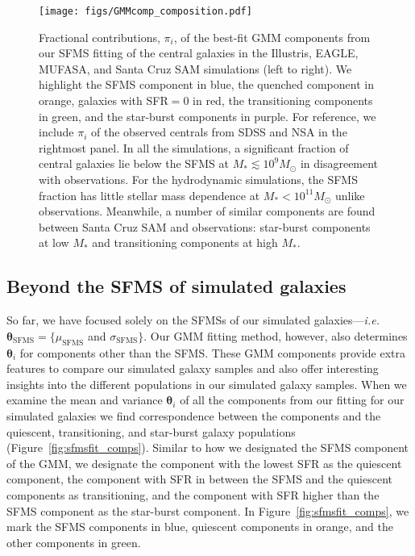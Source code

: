 \documentclass[preprint2,tighten]{aastex62}
\begin{document}
\begin{figure*}
\begin{center}
\texttt{[image: figs/GMMcomp\_composition.pdf]} 
\caption{Fractional contributions, $\pi_i$, of the best-fit GMM components from 
    our SFMS fitting of the central galaxies in the Illustris, EAGLE, MUFASA, 
    and Santa Cruz SAM simulations (left to right). We highlight the SFMS 
    component in blue, the quenched component in orange, galaxies with 
    SFR$=0$ in red, the transitioning components in green, and the star-burst
    components in purple. For reference, we include $\pi_i$ of the observed 
    centrals from SDSS and NSA in the rightmost panel. In all the simulations, 
    a significant fraction of central galaxies lie below the SFMS at 
    $M_* \lesssim 10^9 M_\odot$ in disagreement with observations. For the 
    hydrodynamic simulations, the SFMS fraction has little stellar mass dependence
    at $M_* < 10^{11}M_\odot$ unlike observations. Meanwhile, a number of similar 
    components are found between Santa Cruz SAM and observations: star-burst 
    components at low $M_*$ and transitioning components at high $M_*$. 
    } \label{fig:kandinsky}
\end{center}
\end{figure*}

\subsection{Beyond the SFMS of simulated galaxies}
So far, we have focused solely on the SFMSs of our simulated 
galaxies---\emph{i.e.} $\bm{\theta}_\mathrm{SFMS} = \{\mu_\mathrm{SFMS}$ 
and $\sigma_\mathrm{SFMS} \}$. Our GMM fitting method, however, also determines 
$\bm{\theta}_i$ for components other than the SFMS. These GMM components 
provide extra features to compare our simulated galaxy samples and also offer 
interesting insights into the different populations in our simulated galaxy
samples. When we examine the mean and variance $\bm{\theta}_i$ of all the 
components from our fitting for our simulated galaxies we find correspondence 
between the components and the quiescent, transitioning, and star-burst galaxy 
populations (Figure~\ref{fig:sfmsfit_comps}). Similar to how we designated the 
SFMS component of the GMM, we designate the component with the lowest SFR as the quiescent 
component, the component with SFR in between the SFMS and the quiescent 
components as transitioning, and the component with SFR higher than the 
SFMS component as the star-burst component. In Figure~\ref{fig:sfmsfit_comps}, 
we mark the SFMS components in blue, quiescent components in orange, and 
the other components in green. 
\end{document}
